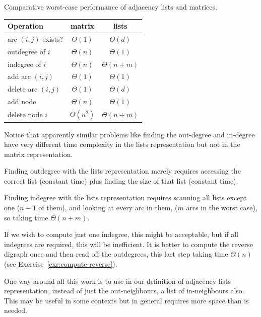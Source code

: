 \begin{center}
Comparative worst-case performance of adjacency lists and matrices.

\begin{tabular}{|l|c|c|}
\hline

\textbf{Operation} & \textbf{matrix} & \textbf{lists} \\
\hline

arc $(i, j)$ exists? & $\Theta(1)$  & $\Theta(d)$ \\
\hline
outdegree  of $i$ & $\Theta(n)$ & $\Theta(1)$ \\
\hline
indegree of $i$ & $\Theta(n)$ &  $\Theta(n+m)$ \\
\hline
add arc $(i, j)$ & $\Theta(1)$ & $\Theta(1)$  \\
\hline
delete arc $(i, j)$ & $\Theta(1)$  & $\Theta(d)$  \\
\hline
add node & $\Theta(n)$ & $\Theta(1)$  \\
\hline
delete node $i$ & $\Theta(n^2)$  & $\Theta(n+m)$  \\
\hline
\end{tabular}
\end{center}

Notice that apparently similar problems like finding the out-degree and in-degree have very different time complexity in the lists representation but not in the matrix representation. 

Finding outdegree with the lists representation merely requires accessing
the correct list (constant time) plus finding the size of  that list
(constant time). 

Finding indegree with the  lists representation requires
scanning all lists except one ($n-1$ of them), and looking at every arc in
them, ($m$ arcs in the worst case), so taking time $\Theta(n+m)$. 



If we wish to compute just one indegree, this might be acceptable, but if all indegrees are required,
this will be inefficient. It is better to compute the reverse digraph once
and then read off the outdegrees, this last step taking time $\Theta(n)$ 
(see Exercise~\ref{exr:compute-reverse}).

One way around all this work is to use in
our definition of adjacency lists representation, instead of just the
out-neighbours, a list of in-neighbours also. This may be useful in some
contexts but in general requires more space than is needed.



